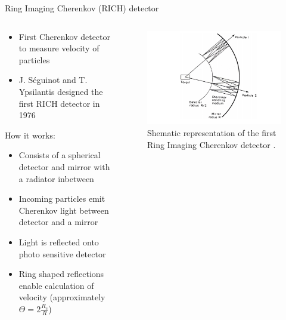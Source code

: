 \documentclass[aspectratio=1610, 10pt]{beamer}
\begin{document}
\begin{frame}{Ring Imaging Cherenkov (RICH) detector}
  \begin{columns}
  \begin{column}{0.5\textwidth}
  \begin{itemize}
    \item First Cherenkov detector to measure velocity of particles
    \medskip
    \item J. S\'{e}guinot and T. Ypsilantis designed the first RICH detector in 1976
  \end{itemize}
\vspace{0.5cm}
How it works:
\begin{itemize}
  \item Consists of a spherical detector and mirror with a radiator inbetween
  \medskip
  \item Incoming particles emit Cherenkov light between detector and a mirror
  \medskip
  \item Light is reflected onto photo sensitive detector
  \medskip
  \item Ring shaped reflections enable calculation of velocity (approximately $\Theta = 2 \frac{R_c}{R}$)
\end{itemize}
\end{column}
\begin{column}{0.5\textwidth}
  \begin{figure}
    \includegraphics[width=1\textwidth]{images/rich.png}
    \caption{Shematic representation of the first Ring Imaging Cherenkov detector \cite{gaseous}.}
  \end{figure}
\end{column}
\end{columns}
\end{frame}
\end{document}
